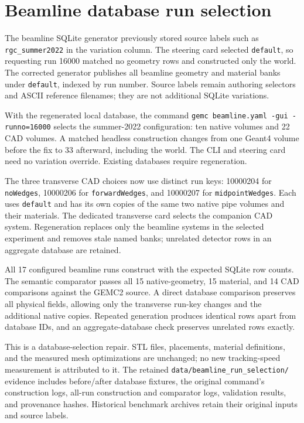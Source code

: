 \FloatBarrier
\section{Beamline database run selection}
\label{sec:beamline-run-selection}

The beamline SQLite generator previously stored source labels such as \texttt{rgc\_summer2022} in the
variation column. The steering card selected \texttt{default}, so requesting run 16000 matched no geometry
rows and constructed only the world. The corrected generator publishes all beamline geometry and material
banks under \texttt{default}, indexed by run number. Source labels remain authoring selectors and ASCII
reference filenames; they are not additional SQLite variations.

With the regenerated local database, the command
\texttt{gemc beamline.yaml -gui -runno=16000} selects the summer-2022 configuration: ten native volumes
and 22 CAD volumes. A matched headless construction changes from one Geant4 volume before the fix to 33
afterward, including the world. The CLI and steering card need no variation override. Existing databases
require regeneration.

The three transverse CAD choices now use distinct run keys: 10000204 for \texttt{noWedges}, 10000206 for
\texttt{forwardWedges}, and 10000207 for \texttt{midpointWedges}. Each uses \texttt{default} and has its own
copies of the same two native pipe volumes and their materials. The dedicated transverse card selects the
companion CAD system. Regeneration replaces only the beamline systems in the selected experiment and removes
stale named banks; unrelated detector rows in an aggregate database are retained.

All 17 configured beamline runs construct with the expected SQLite row counts. The semantic comparator
passes all 15 native-geometry, 15 material, and 14 CAD comparisons against the GEMC2 source. A direct
database comparison preserves all physical fields, allowing only the transverse run-key changes and
the additional native copies. Repeated generation produces identical rows apart from database IDs,
and an aggregate-database check preserves unrelated rows exactly.

This is a database-selection repair. STL files, placements, material definitions, and the measured mesh
optimizations are unchanged; no new tracking-speed measurement is attributed to it. The retained
\texttt{data/beamline\_run\_selection/} evidence includes before/after database fixtures, the original
command's construction logs, all-run construction and comparator logs, validation results, and provenance
hashes. Historical benchmark archives retain their original inputs and source labels.
